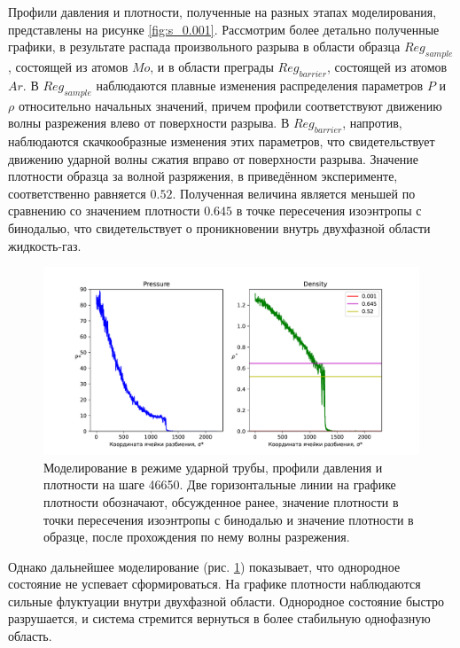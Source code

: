 Профили давления и плотности, полученные на разных этапах моделирования, представлены на рисунке \ref{fig:s_0.001}. Рассмотрим более детально полученные графики, в результате распада произвольного разрыва в области образца $Reg_{sample}$, состоящей из атомов $Mo$, и в области преграды $Reg_{barrier}$, состоящей из атомов $Ar$. В $Reg_{sample}$ наблюдаются плавные изменения распределения параметров $𝑃$ и $\rho$ относительно начальных значений, причем профили соответствуют движению волны разрежения влево от поверхности разрыва. В $Reg_{barrier}$, напротив, наблюдаются скачкообразные изменения этих параметров, что свидетельствует движению ударной волны сжатия вправо от поверхности разрыва. Значение плотности образца за волной разряжения, в приведённом эксперименте, соответственно равняется $0.52$. Полученная величина является меньшей по сравнению со значением плотности $0.645$ в точке пересечения изоэнтропы с бинодалью, что свидетельствует о проникновении внутрь двухфазной области жидкость-газ.

\begin{figure}[ht]
    \includegraphics[width=\linewidth]{img/example_0.001/relax_wave46650.pdf}
    \caption{\label{fig:s_0.001_46650} Моделирование в режиме ударной трубы, профили давления и плотности на шаге 46650. Две горизонтальные линии на графике плотности обозначают, обсужденное ранее, значение плотности в точки пересечения изоэнтропы с бинодалью и значение плотности в образце, после прохождения по нему волны разрежения.}
\end{figure}

Однако дальнейшее моделирование (рис. \ref{fig:s_0.001_46650}) показывает, что однородное состояние не успевает сформироваться. На графике плотности наблюдаются сильные флуктуации внутри двухфазной области. Однородное состояние быстро разрушается, и система стремится вернуться в более стабильную однофазную область. 

